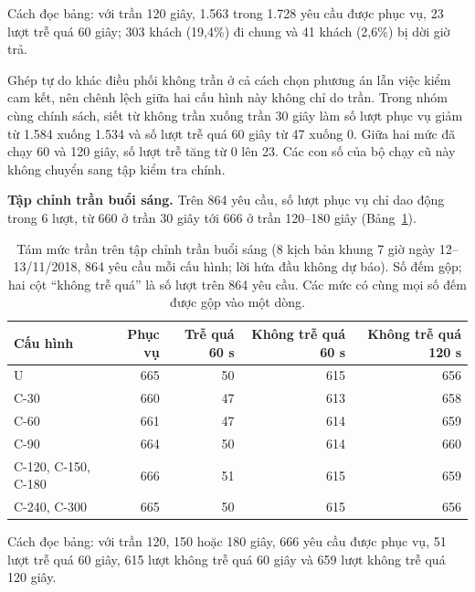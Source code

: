 Cách đọc bảng: với trần 120 giây, 1.563 trong 1.728 yêu cầu được phục vụ, 23 lượt trễ quá 60 giây; 303 khách (19,4\%)
đi chung và 41 khách (2,6\%) bị dời giờ trả.

Ghép tự do khác điều phối không trần ở cả cách chọn phương án lẫn việc kiểm cam kết, nên chênh lệch giữa hai cấu hình
này không chỉ do trần. Trong nhóm cùng chính sách, siết từ không trần xuống trần 30 giây làm số lượt phục vụ giảm từ
1.584 xuống 1.534 và số lượt trễ quá 60 giây từ 47 xuống 0. Giữa hai mức đã chạy 60 và 120 giây, số lượt trễ tăng từ 0
lên 23. Các con số của bộ chạy cũ này không chuyển sang tập kiểm tra chính.

\textbf{Tập chỉnh trần buổi sáng.} Trên 864 yêu cầu, số lượt phục vụ chỉ dao động trong 6 lượt, từ 660 ở trần 30 giây
tới 666 ở trần 120--180 giây (Bảng~\ref{bang:c4-sang}).

\begin{table}[htbp]
\centering
\caption{Tám mức trần trên tập chỉnh trần buổi sáng (8 kịch bản khung 7 giờ ngày 12--13/11/2018, 864 yêu cầu
mỗi cấu hình; lời hứa đầu không dự báo). Số đếm gộp; hai cột ``không trễ quá'' là số lượt trên 864 yêu cầu. Các mức
có cùng mọi số đếm được gộp vào một dòng.}
\label{bang:c4-sang}
\small
\begin{tabular}{@{}lrrrr@{}}
\toprule
\textbf{Cấu hình} & \textbf{Phục vụ} & \textbf{Trễ quá 60 s} & \textbf{Không trễ quá 60 s} &
\textbf{Không trễ quá 120 s}\\
\midrule
U & 665 & 50 & 615 & 656\\
C-30 & 660 & 47 & 613 & 658\\
C-60 & 661 & 47 & 614 & 659\\
C-90 & 664 & 50 & 614 & 660\\
C-120, C-150, C-180 & 666 & 51 & 615 & 659\\
C-240, C-300 & 665 & 50 & 615 & 656\\
\bottomrule
\end{tabular}
\end{table}

Cách đọc bảng: với trần 120, 150 hoặc 180 giây, 666 yêu cầu được phục vụ, 51 lượt trễ quá 60 giây, 615 lượt không trễ
quá 60 giây và 659 lượt không trễ quá 120 giây.

